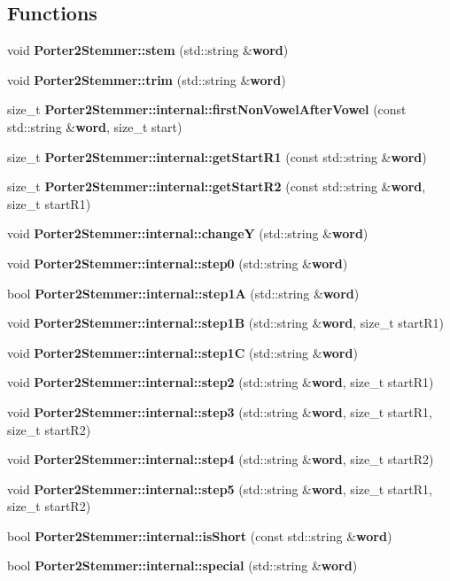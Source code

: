 \subsection*{Functions}
\begin{DoxyCompactItemize}
\item 
void {\bfseries Porter2\+Stemmer\+::stem} (std\+::string \&{\bf word})\label{porter2__stemmer_8h_ad07c4652a1144329db4bdfb6ce640d80}

\item 
void {\bfseries Porter2\+Stemmer\+::trim} (std\+::string \&{\bf word})\label{porter2__stemmer_8h_ac74222c2eb041cff861fddfd529bc983}

\item 
size\+\_\+t {\bfseries Porter2\+Stemmer\+::internal\+::first\+Non\+Vowel\+After\+Vowel} (const std\+::string \&{\bf word}, size\+\_\+t start)\label{porter2__stemmer_8h_a4419080bc3b64aca4998a732e9f99d84}

\item 
size\+\_\+t {\bfseries Porter2\+Stemmer\+::internal\+::get\+Start\+R1} (const std\+::string \&{\bf word})\label{porter2__stemmer_8h_a2d7e133e04950f30c9b3a2935be7c802}

\item 
size\+\_\+t {\bfseries Porter2\+Stemmer\+::internal\+::get\+Start\+R2} (const std\+::string \&{\bf word}, size\+\_\+t start\+R1)\label{porter2__stemmer_8h_a87bb0a5733b6267185b7951349477070}

\item 
void {\bfseries Porter2\+Stemmer\+::internal\+::changeY} (std\+::string \&{\bf word})\label{porter2__stemmer_8h_add0f2aec57b66845cb78e98844bb4205}

\item 
void {\bf Porter2\+Stemmer\+::internal\+::step0} (std\+::string \&{\bf word})
\item 
bool {\bf Porter2\+Stemmer\+::internal\+::step1A} (std\+::string \&{\bf word})
\item 
void {\bf Porter2\+Stemmer\+::internal\+::step1B} (std\+::string \&{\bf word}, size\+\_\+t start\+R1)
\item 
void {\bf Porter2\+Stemmer\+::internal\+::step1C} (std\+::string \&{\bf word})
\item 
void {\bf Porter2\+Stemmer\+::internal\+::step2} (std\+::string \&{\bf word}, size\+\_\+t start\+R1)
\item 
void {\bf Porter2\+Stemmer\+::internal\+::step3} (std\+::string \&{\bf word}, size\+\_\+t start\+R1, size\+\_\+t start\+R2)
\item 
void {\bf Porter2\+Stemmer\+::internal\+::step4} (std\+::string \&{\bf word}, size\+\_\+t start\+R2)
\item 
void {\bf Porter2\+Stemmer\+::internal\+::step5} (std\+::string \&{\bf word}, size\+\_\+t start\+R1, size\+\_\+t start\+R2)
\item 
bool {\bf Porter2\+Stemmer\+::internal\+::is\+Short} (const std\+::string \&{\bf word})
\item 
bool {\bfseries Porter2\+Stemmer\+::internal\+::special} (std\+::string \&{\bf word})\label{porter2__stemmer_8h_a7c20680dfe258c8050c8225d97b2e160}


\end{DoxyCompactItemize}
